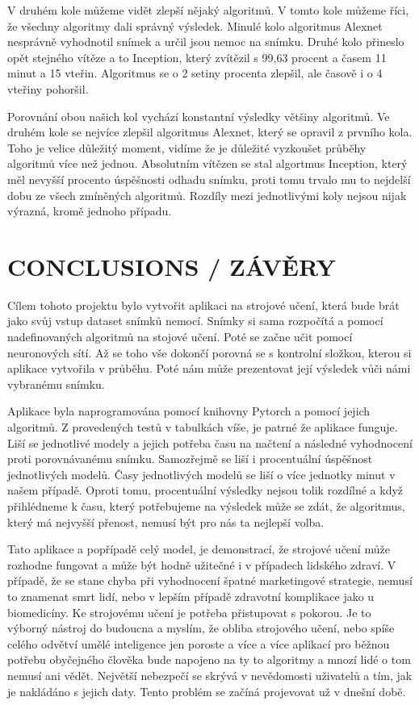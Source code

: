 \documentclass[journal]{IEEEtran}
\begin{document}
V druhém kole můžeme vidět zlepší nějaký algoritmů. V tomto kole můžeme říci, že všechny algoritmy dali správný výsledek. Minulé kolo algoritmus Alexnet nesprávně vyhodnotil snímek a určil jsou nemoc na snímku. Druhé kolo přineslo opět stejného vítěze a to Inception, který zvítězil s 99,63 procent a časem 11 minut a 15 vteřin. Algoritmus se o 2 setiny procenta zlepšil, ale časově i o 4 vteřiny pohoršil. 

Porovnání obou našich kol vychází konstantní výsledky většiny algoritmů. Ve druhém kole se nejvíce zlepšil algoritmus Alexnet, který se opravil z prvního kola. Toho je velice důležitý moment, vidíme že je důležité vyzkoušet průběhy algoritmů více než jednou. Absolutním vítězen se stal algortmus Inception, který měl nevyšší procento úspěšnosti odhadu snímku, proti tomu trvalo mu to nejdelší dobu ze všech zmíněných algoritmů. Rozdíly mezi jednotlivými koly nejsou nijak výrazná, kromě jednoho případu. 


\section{CONCLUSIONS / ZÁVĚRY}
Cílem tohoto projektu bylo vytvořit aplikaci na strojové učení, která bude brát jako svůj vstup dataset snímků nemocí. Snímky si sama rozpočítá a pomocí nadefinovaných algoritmů na stojové učení. Poté se začne učit pomocí neuronových sítí. Až se toho vše dokončí porovná se s kontrolní složkou, kterou si aplikace vytvořila v průběhu. Poté nám může prezentovat její výsledek vůči námi vybranému snímku. 

Aplikace byla naprogramována pomocí knihovny Pytorch a pomocí jejich algoritmů. Z provedených testů v tabulkách víše, je patrné že aplikace funguje. Liší se jednotlivé modely a jejich potřeba času na načtení a následné vyhodnocení proti porovnávanému snímku. Samozřejmě se liší i procentuální úspěšnost jednotlivých modelů. Časy jednotlivých modelů se liší o více jednotky minut v našem případě. Oproti tomu, procentuální výsledky nejsou tolik rozdílné a když přihlédneme k času, který potřebujeme na výsledek může se zdát, že algoritmus, který má nejvyšší přenost, nemusí být pro nás ta nejlepší volba. 

Tato aplikace a popřípadě celý model, je demonstrací, že strojové učení může rozhodne fungovat a může být hodně užitečné i v případech lidského zdraví. V případě, že se stane chyba při vyhodnocení špatné marketingové strategie, nemusí to znamenat smrt lidí, nebo v lepším případě zdravotní komplikace jako u biomedicíny. Ke strojovému učení je potřeba přistupovat s pokorou. Je to výborný nástroj do budoucna a myslím, že obliba strojového učení, nebo spíše celého odvětví umělé inteligence jen poroste a více a více aplikací pro běžnou potřebu obyčejného člověka bude napojeno na ty to algoritmy a mnozí lidé o tom nemusí ani vědět. Největší nebezpečí se skrývá v nevědomosti uživatelů a tím, jak je nakládáno s jejich daty. Tento problém se začíná projevovat už v dnešní době. 
\end{document}
